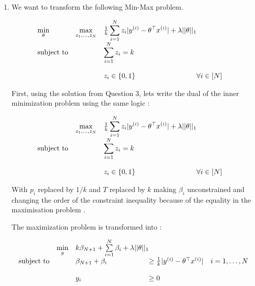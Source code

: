 \documentclass[10pt]{article}
\newenvironment{exercise}[2][Exercise]{\begin{trivlist}
  \item[\hskip \labelsep {\bfseries #1}\hskip \labelsep {\bfseries #2.}]}{\end{trivlist}}
\begin{document}
 
\begin{exercise}{7}

\begin{enumerate}
    \item 

We want to transform the following Min-Max problem. 

\begin{equation*}
\begin{array}{lll@{}lll}
\min\limits_{\theta}&\max\limits_{z_1,...,z_N}  &\frac{1}{k}\displaystyle\sum\limits_{i=1}^{N}z_i|y^{(i)} - \theta^\top x^{(i)}| +  \lambda||\theta||_1 &\\
\text{subject to} 
&& \displaystyle\sum\limits_{i=1}^{N}z_i = k  && \\
                \\
                && z_i \in  \{ 0, 1 \}   & \forall i \in [ N ]& 
\end{array}
\end{equation*}


First, using the solution from Question 3, lets write the dual of the inner minimization problem using the same logic : 


\begin{equation*}
\begin{array}{lll@{}lll}
&\max\limits_{z_1,...,z_N}  &\frac{1}{k}\displaystyle\sum\limits_{i=1}^{N}z_i|y^{(i)} - \theta^\top x^{(i)}| +  \lambda||\theta||_1 &\\
\text{subject to} 
&& \displaystyle\sum\limits_{i=1}^{N}z_i = k  &&  \\
                \\
                && z_i \in  \{ 0, 1 \}   & \forall i \in [ N ]& 
\end{array}
\end{equation*}

With $p_i$  replaced by $ 1 / k$ and $T$ replaced by $k$ making  $\beta_i$  unconstrained and changing the order of the constraint inequality because of the equality in the maximisation problem  . 

The maximization problem is transformed into : 

\begin{equation*}
\begin{array}{lll@{}lll}
&\min\limits_{y}   &  k\beta_{N + 1 }  + \sum\limits_{i=1}^{N}\beta_i  + \lambda||\theta||_1  &\\
\text{subject to} 

&&  \beta_{N + 1 } + \beta_i   & \geq \frac{1}{k}|y^{(i)} - \theta^\top x^{(i)}| &  i=1 ,\dots, N \\
                \\
                && y_i    &  \geq 0 %
\end{array}
\end{equation*}


\end{enumerate}
\end{exercise}
\end{document}
